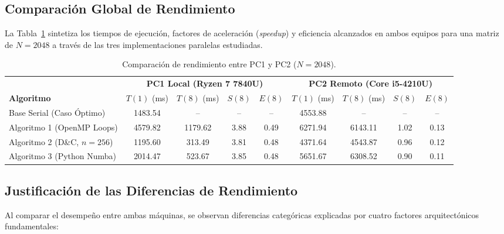 \subsection{Comparación Global de Rendimiento}
La Tabla~\ref{tab:resumen_comparativo_pcs} sintetiza los tiempos de ejecución, factores de aceleración (\emph{speedup}) y eficiencia alcanzados en ambos equipos para una matriz de $N=2048$ a través de las tres implementaciones paralelas estudiadas.

\begin{table}[htbp]
\centering
\footnotesize
\setlength{\tabcolsep}{4pt}
\caption{Comparación de rendimiento entre PC1 y PC2 ($N=2048$).}
\label{tab:resumen_comparativo_pcs}
\begin{tabular}{l cccc cccc}
\toprule
& \multicolumn{4}{c}{\textbf{PC1 Local (Ryzen 7 7840U)}} & \multicolumn{4}{c}{\textbf{PC2 Remoto (Core i5-4210U)}} \\
\cmidrule(lr){2-5} \cmidrule(lr){6-9}
\textbf{Algoritmo} & $T(1)$ (ms) & $T(8)$ (ms) & $S(8)$ & $E(8)$ & $T(1)$ (ms) & $T(8)$ (ms) & $S(8)$ & $E(8)$ \\
\midrule
Base Serial (Caso Óptimo)  & 1483.54 & -- & -- & -- & 4553.88 & -- & -- & -- \\
Algoritmo 1 (OpenMP Loops) & 4579.82 & 1179.62 & 3.88 & 0.49 & 6271.94 & 6143.11 & 1.02 & 0.13 \\
Algoritmo 2 (D\&C, $n=256$)& 1195.60 &  313.49 & 3.81 & 0.48 & 4371.64 & 4543.87 & 0.96 & 0.12 \\
Algoritmo 3 (Python Numba) & 2014.47 &  523.67 & 3.85 & 0.48 & 5651.67 & 6308.52 & 0.90 & 0.11 \\
\bottomrule
\end{tabular}
\end{table}

\subsection{Justificación de las Diferencias de Rendimiento}
Al comparar el desempeño entre ambas máquinas, se observan diferencias categóricas explicadas por cuatro factores arquitectónicos fundamentales:

